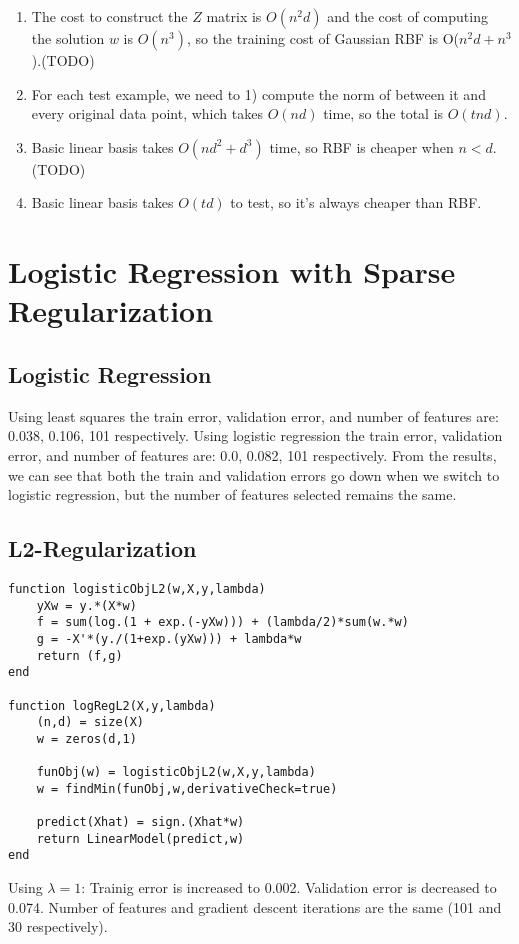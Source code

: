 \documentclass{article}
\def\enum#1{\begin{enumerate}#1\end{enumerate}}
\begin{document}
\enum{
\item  The cost to construct the $Z$ matrix is $O(n^2d)$ and the cost of computing the solution $w$ is $O(n^3)$, so the training cost of Gaussian RBF is O($n^2d+n^3$).(TODO)
\item For each test example, we need to 1) compute the norm of between it and every original data point, which takes $O(nd)$ time, so the total is $O(tnd)$.
\item  Basic linear basis takes $O(nd^2 + d^3)$ time, so RBF is cheaper when $ n < d$. (TODO)
 \item  Basic linear basis takes $O(td)$ to test, so it's always cheaper than RBF.
}



\section{Logistic Regression with Sparse Regularization}

\subsection{Logistic Regression}

Using least squares the train error, validation error, and number of features are: 0.038, 0.106, 101 respectively. Using logistic regression the train error, validation error, and number of features are: 0.0, 0.082, 101 respectively. From the results, we can see that both the train and validation errors go down when we switch to logistic regression, but the number of features selected remains the same.

\subsection{L2-Regularization}

\begin{verbatim}
function logisticObjL2(w,X,y,lambda)
    yXw = y.*(X*w)
    f = sum(log.(1 + exp.(-yXw))) + (lambda/2)*sum(w.*w)
    g = -X'*(y./(1+exp.(yXw))) + lambda*w
    return (f,g)
end

function logRegL2(X,y,lambda)
    (n,d) = size(X)
    w = zeros(d,1)

    funObj(w) = logisticObjL2(w,X,y,lambda)
    w = findMin(funObj,w,derivativeCheck=true)

    predict(Xhat) = sign.(Xhat*w)
    return LinearModel(predict,w)
end
\end{verbatim}
Using $\lambda = 1$:
Trainig error is increased to 0.002.
Validation error is decreased to 0.074.
Number of features and gradient descent iterations are the same (101 and 30 respectively).
\end{document}
